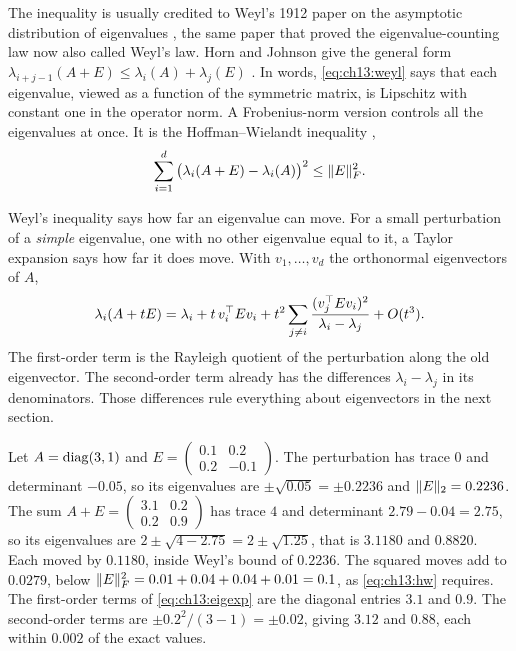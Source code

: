 The inequality is usually credited to Weyl's 1912 paper on the asymptotic
distribution of eigenvalues \cite{weyl1912}, the same paper that proved the
eigenvalue-counting law now also called Weyl's law. Horn and Johnson give the
general form $\lambda_{i+j-1}(A+E)\le\lambda_i(A)+\lambda_j(E)$
\cite{hornjohnson2012}. In words, \cref{eq:ch13:weyl} says that each eigenvalue,
viewed as a function of the symmetric matrix, is Lipschitz with constant one in
the operator norm. A Frobenius-norm version controls all the eigenvalues at once.
It is the Hoffman--Wielandt inequality \cite{hornjohnson2012},
\begin{equation}\label{eq:ch13:hw}
\sum_{i=1}^d\big(\lambda_i(A+E)-\lambda_i(A)\big)^2\le\lVert E\rVert_F^2 .
\end{equation}

Weyl's inequality says how far an eigenvalue can move. For a small perturbation
of a \emph{simple} eigenvalue, one with no other eigenvalue equal to it, a Taylor
expansion says how far it does move. With $v_1,\dots,v_d$ the orthonormal
eigenvectors of $A$,
\begin{equation}\label{eq:ch13:eigexp}
\lambda_i(A+tE)=\lambda_i+t\,v_i^{\top} Ev_i+t^2\sum_{j\ne i}\frac{(v_j^{\top} Ev_i)^2}{\lambda_i-\lambda_j}+O(t^3).
\end{equation}
The first-order term is the Rayleigh quotient of the perturbation along the old
eigenvector. The second-order term already has the differences
$\lambda_i-\lambda_j$ in its denominators. Those differences rule everything
about eigenvectors in the next section.

\begin{example}\label{ex:ch13:weyl}
Let $A=\operatorname{diag}(3,1)$ and
$E=\begin{pmatrix}0.1&0.2\\0.2&-0.1\end{pmatrix}$. The perturbation has trace
$0$ and determinant $-0.05$, so its eigenvalues are $\pm\sqrt{0.05}=\pm0.2236$
and $\lVert E\rVert_2=0.2236$. The sum
$A+E=\begin{pmatrix}3.1&0.2\\0.2&0.9\end{pmatrix}$ has trace $4$ and determinant
$2.79-0.04=2.75$, so its eigenvalues are $2\pm\sqrt{4-2.75}=2\pm\sqrt{1.25}$,
that is $3.1180$ and $0.8820$. Each moved by $0.1180$, inside Weyl's bound of
$0.2236$. The squared moves add to $0.0279$, below $\lVert E\rVert_F^2=0.01+0.04+0.04+0.01=0.1$,
as \cref{eq:ch13:hw} requires. The first-order terms of \cref{eq:ch13:eigexp}
are the diagonal entries $3.1$ and $0.9$. The second-order terms are
$\pm0.2^2/(3-1)=\pm0.02$, giving $3.12$ and $0.88$, each within $0.002$ of the
exact values.
\end{example}


